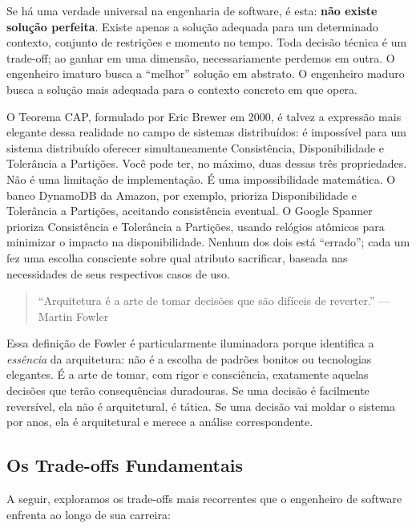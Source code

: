 Se há uma verdade universal na engenharia de software, é esta:
\textbf{não existe solução perfeita}. Existe apenas a solução adequada
para um determinado contexto, conjunto de restrições e momento no tempo.
Toda decisão técnica é um trade-off; ao ganhar em uma dimensão,
necessariamente perdemos em outra. O engenheiro imaturo busca a
``melhor'' solução em abstrato. O engenheiro maduro busca a solução mais
adequada para o contexto concreto em que opera.

O Teorema CAP, formulado por Eric Brewer em 2000, é talvez a expressão
mais elegante dessa realidade no campo de sistemas distribuídos: é
impossível para um sistema distribuído oferecer simultaneamente
Consistência, Disponibilidade e Tolerância a Partições. Você pode ter,
no máximo, duas dessas três propriedades. Não é uma limitação de
implementação. É uma impossibilidade matemática. O banco DynamoDB da
Amazon, por exemplo, prioriza Disponibilidade e Tolerância a Partições,
aceitando consistência eventual. O Google Spanner prioriza Consistência
e Tolerância a Partições, usando relógios atômicos para minimizar o
impacto na disponibilidade. Nenhum dos dois está ``errado''; cada um
fez uma escolha consciente sobre qual atributo sacrificar, baseada nas
necessidades de seus respectivos casos de uso.

\begin{quote}
``Arquitetura é a arte de tomar decisões que são difíceis de reverter.''
--- Martin Fowler
\end{quote}

Essa definição de Fowler é particularmente iluminadora porque identifica
a \emph{essência} da arquitetura: não é a escolha de padrões bonitos ou
tecnologias elegantes. É a arte de tomar, com rigor e consciência,
exatamente aquelas decisões que terão consequências duradouras. Se uma
decisão é facilmente reversível, ela não é arquitetural, é tática.
Se uma decisão vai moldar o sistema por anos, ela é arquitetural e
merece a análise correspondente.

\subsection{Os Trade-offs Fundamentais}

A seguir, exploramos os trade-offs mais recorrentes que o engenheiro de
software enfrenta ao longo de sua carreira:

